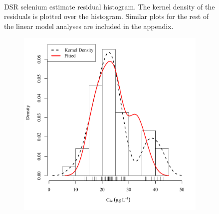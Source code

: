\begin{landscape}
\begin{figure}
\begin{subfigure}{0.7\textwidth}
		\end{subfigure}\\
		\caption[DSR selenium estimate residual histogram.]{DSR selenium estimate residual histogram.  The kernel density of the residuals is plotted over the histogram.  Similar plots for the rest of the linear model analyses are included in the appendix.}
		\label{fig:concResHist_DS}
	\end{figure}
\end{landscape}

\subfiguremid
\begin{landscape}
	\begin{figure}
		\begin{subfigure}{0.7\textwidth}
			\centering
			\includegraphics[width=\tableCustomSize]{"Figures/Results_DSR/Stochastic/Conc Model ResDist BIG"}
		\end{subfigure}%
		\begin{subfigure}{0.7\textwidth}
			\centering

\end{subfigure}
\end{figure}
\end{landscape}
